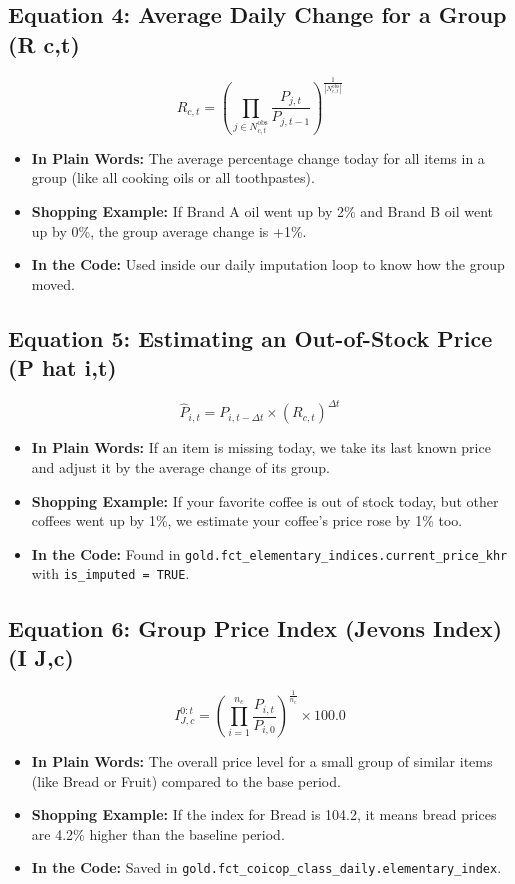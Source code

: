 \documentclass[11pt,a4paper,oneside]{article}
\begin{document}
\subsection{Equation 4: Average Daily Change for a Group (R {c,t})}
\begin{equation}
R_{c, t} = \left( \prod_{j \in N_{c, t}^{\text{obs}}} \frac{P_{j, t}}{P_{j, t-1}} \right)^{\frac{1}{|N_{c, t}^{\text{obs}}|}}
\end{equation}
\begin{itemize}
    \item \textbf{In Plain Words:} The average percentage change today for all items in a group (like all cooking oils or all toothpastes).
    \item \textbf{Shopping Example:} If Brand A oil went up by 2\% and Brand B oil went up by 0\%, the group average change is +1\%.
    \item \textbf{In the Code:} Used inside our daily imputation loop to know how the group moved.
\end{itemize}

\subsection{Equation 5: Estimating an Out-of-Stock Price (P hat {i,t})}
\begin{equation}
\widehat{P}_{i, t} = P_{i, t-\Delta t} \times \left( R_{c, t} \right)^{\Delta t}
\end{equation}
\begin{itemize}
    \item \textbf{In Plain Words:} If an item is missing today, we take its last known price and adjust it by the average change of its group.
    \item \textbf{Shopping Example:} If your favorite coffee is out of stock today, but other coffees went up by 1\%, we estimate your coffee's price rose by 1\% too.
    \item \textbf{In the Code:} Found in \texttt{gold.fct\_elementary\_indices.current\_price\_khr} with \texttt{is\_imputed = TRUE}.
\end{itemize}

\subsection{Equation 6: Group Price Index (Jevons Index) (I {J,c})}
\begin{equation}
I_{J, c}^{0:t} = \left( \prod_{i=1}^{n_c} \frac{P_{i, t}}{P_{i, 0}} \right)^{\frac{1}{n_c}} \times 100.0
\end{equation}
\begin{itemize}
    \item \textbf{In Plain Words:} The overall price level for a small group of similar items (like Bread or Fruit) compared to the base period.
    \item \textbf{Shopping Example:} If the index for Bread is 104.2, it means bread prices are 4.2\% higher than the baseline period.
    \item \textbf{In the Code:} Saved in \texttt{gold.fct\_coicop\_class\_daily.elementary\_index}.
\end{itemize}
\end{document}

